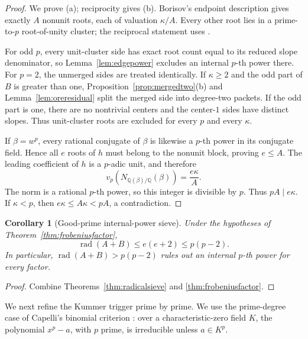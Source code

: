 \documentclass[11pt]{article}
\newtheorem{corollary}[theorem]{Corollary}
\theoremstyle{definition}
\newcommand{\Q}{\mathbb Q}
\begin{document}
\begin{proof}
We prove (a); reciprocity gives (b).  Borisov's endpoint description
\cite[Lemma~2.10]{Borisov1998} gives exactly \(A\) nonunit roots, each of
valuation \(\kappa/A\).  Every other root lies in a prime-to-\(p\)
root-of-unity cluster; the reciprocal statement uses
\cite[Lemma~2.11]{Borisov1998}.

For odd \(p\), every unit-cluster side has exact root count equal to its
reduced slope denominator, so Lemma~\ref{lem:edgepower} excludes an internal
\(p\)-th power there.  For \(p=2\), the unmerged sides are treated
identically.  If \(\kappa\geq2\) and the odd part of \(B\) is greater than
one, Proposition~\ref{prop:mergedtwo}(b) and
Lemma~\ref{lem:oreresidual} split the merged side into degree-two packets.
If the odd part is one, there are no nontrivial centers and the center-\(1\)
sides have distinct slopes.  Thus unit-cluster roots are excluded for every
\(p\) and every \(\kappa\).

If \(\beta=w^p\), every rational conjugate of \(\beta\) is likewise a
\(p\)-th power in its conjugate field.  Hence all \(e\) roots of \(h\) must
belong to the nonunit block, proving \(e\leq A\).  The leading coefficient
of \(h\) is a \(p\)-adic unit, and therefore
\[
 v_p\!\left(N_{\Q(\beta)/\Q}(\beta)\right)
 =\frac{e\kappa}{A}.
\]
The norm is a rational \(p\)-th power, so this integer is divisible by
\(p\).  Thus \(pA\mid e\kappa\).  If \(\kappa<p\), then
\(e\kappa\leq A\kappa<pA\), a contradiction.
\end{proof}

\begin{corollary}[Good-prime internal-power sieve]
\label{cor:goodpower}
Under the hypotheses of Theorem~\ref{thm:frobeniusfactor},
\[
 \operatorname{rad}(A+B)\leq e(e+2)\leq p(p-2).
\]
In particular, \(\operatorname{rad}(A+B)>p(p-2)\) rules out an internal
\(p\)-th power for every factor.
\end{corollary}

\begin{proof}
Combine Theorems~\ref{thm:radicalsieve} and
\ref{thm:frobeniusfactor}.
\end{proof}

We next refine the Kummer trigger prime by prime.  We use the prime-degree
case of Capelli's binomial criterion
\cite[Chapter~VI, Section~9]{LangAlgebra}: over a characteristic-zero field
\(K\), the polynomial \(x^p-a\), with \(p\) prime, is irreducible unless
\(a\in K^p\).
\end{document}
